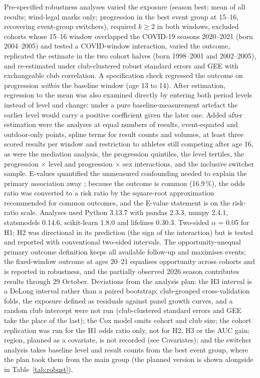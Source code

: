 \documentclass[12pt,a4paper]{article}
\begin{document}
Pre-specified robustness analyses varied the exposure (season best; mean of all results; wind-legal marks only; progression in the best event group at 15--16, recovering event-group switchers), required $k \geq 2$ in both windows, excluded cohorts whose 15--16 window overlapped the COVID-19 seasons 2020--2021 (born 2004--2005) and tested a COVID-window interaction, varied the outcome, replicated the estimate in the two cohort halves (born 1998--2001 and 2002--2005), and re-estimated under club-clustered robust standard errors and GEE with exchangeable club correlation. A specification check regressed the outcome on progression \emph{within} the baseline window (age 13 to 14). After estimation, regression to the mean was also examined directly by entering both period levels instead of level and change: under a pure baseline-measurement artefact the earlier level would carry a positive coefficient given the later one. Added after estimation were the analyses at equal numbers of results, event-equated and outdoor-only points, spline terms for result counts and volumes, at least three scored results per window and restriction to athletes still competing after age 16, as were the mediation analysis, the progression quintiles, the level tertiles, the progression $\times$ level and progression $\times$ sex interactions, and the inclusive switcher sample. E-values quantified the unmeasured confounding needed to explain the primary association away \cite{vanderweele2017}; because the outcome is common (16.9\,\%), the odds ratio was converted to a risk ratio by the square-root approximation recommended for common outcomes, and the E-value statement is on the risk-ratio scale. Analyses used Python 3.13.7 with pandas 2.3.3, numpy 2.4.1, statsmodels 0.14.6, scikit-learn 1.8.0 and lifelines 0.30.3. Two-sided $\alpha$ = 0.05 for H1; H2 was directional in its prediction (the sign of the interaction) but is tested and reported with conventional two-sided intervals. The opportunity-unequal primary outcome definition keeps all available follow-up and maximises events; the fixed-window outcome at ages 20--21 equalises opportunity across cohorts and is reported in robustness, and the partially observed 2026 season contributes results through 29 October. Deviations from the analysis plan: the H3 interval is a DeLong interval rather than a paired bootstrap; club-grouped cross-validation folds, the exposure defined as residuals against panel growth curves, and a random club intercept were not run (club-clustered standard errors and GEE take the place of the last); the Cox model omits cohort and club size; the cohort replication was run for the H1 odds ratio only, not for H2, H3 or the AUC gain; region, planned as a covariate, is not recorded (see Covariates); and the switcher analysis takes baseline level and result counts from the best event group, where the plan took them from the main group (the planned version is shown alongside in Table~\ref{tab:robust}).
\end{document}
